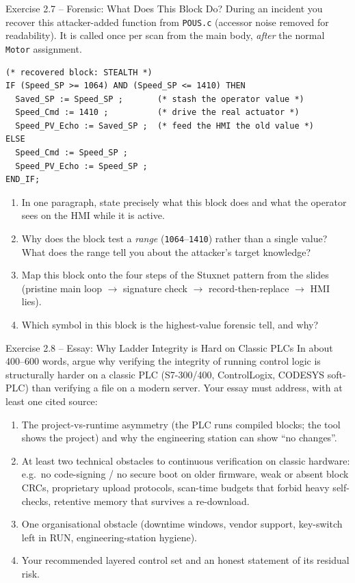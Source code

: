 \documentclass[11pt,a4paper]{article}
\begin{document}
\begin{taskbox}{Exercise 2.7 -- Forensic: What Does This Block Do?}
During an incident you recover this attacker-added function from \texttt{POUS.c} (accessor noise
removed for readability). It is called once per scan from the main body, \emph{after} the normal
\texttt{Motor} assignment.
\begin{lstlisting}
(* recovered block: STEALTH *)
IF (Speed_SP >= 1064) AND (Speed_SP <= 1410) THEN
  Saved_SP := Speed_SP ;       (* stash the operator value *)
  Speed_Cmd := 1410 ;          (* drive the real actuator *)
  Speed_PV_Echo := Saved_SP ;  (* feed the HMI the old value *)
ELSE
  Speed_Cmd := Speed_SP ;
  Speed_PV_Echo := Speed_SP ;
END_IF;
\end{lstlisting}
\begin{enumerate}\setlength{\itemsep}{0pt}
  \item In one paragraph, state precisely what this block does and what the operator sees on the
        HMI while it is active.
  \item Why does the block test a \emph{range} (\texttt{1064}--\texttt{1410}) rather than a single
        value? What does the range tell you about the attacker's target knowledge?
  \item Map this block onto the four steps of the Stuxnet pattern from the slides
        (pristine main loop $\to$ signature check $\to$ record-then-replace $\to$ HMI lies).
  \item Which symbol in this block is the highest-value forensic tell, and why?
\end{enumerate}
\end{taskbox}

\begin{taskbox}{Exercise 2.8 -- Essay: Why Ladder Integrity is Hard on Classic PLCs}
In about 400--600 words, argue why verifying the integrity of running control logic is
structurally harder on a classic PLC (S7-300/400, ControlLogix, CODESYS soft-PLC) than verifying
a file on a modern server. Your essay must address, with at least one cited source:
\begin{enumerate}\setlength{\itemsep}{0pt}
  \item The project-vs-runtime asymmetry (the PLC runs compiled blocks; the tool shows the
        project) and why the engineering station can show ``no changes''.
  \item At least two technical obstacles to continuous verification on classic hardware: e.g.\
        no code-signing / no secure boot on older firmware, weak or absent block CRCs, proprietary
        upload protocols, scan-time budgets that forbid heavy self-checks, retentive memory that
        survives a re-download.
  \item One organisational obstacle (downtime windows, vendor support, key-switch left in RUN,
        engineering-station hygiene).
  \item Your recommended layered control set and an honest statement of its residual risk.
\end{enumerate}
\end{taskbox}
\end{document}
